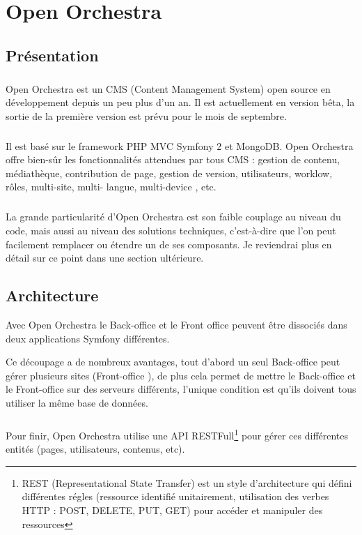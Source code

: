 \chapter{Open Orchestra}
\section{Présentation}
        \paragraph{}
        Open Orchestra est un CMS (Content Management  System) open source en développement depuis un peu plus d'un an. Il est actuellement en version bêta, la sortie de la première version est prévu pour le mois de septembre.
        \paragraph{}
        Il est basé sur le framework PHP MVC Symfony 2 et MongoDB. Open Orchestra offre bien-sûr les fonctionnalités attendues par tous CMS : gestion de contenu, médiathèque, contribution de page, gestion de version, utilisateurs, worklow, rôles,  multi-site, multi- langue,  multi-device , etc.
        \paragraph{}
        La grande particularité d'Open Orchestra est son faible couplage au niveau du code, mais aussi au niveau des solutions techniques, c'est-à-dire que l'on peut facilement remplacer ou étendre un de ses composants. Je reviendrai plus en détail sur ce point dans une section ultérieure.
        
        \section{Architecture}
       Avec Open Orchestra le \og Back-office \fg{} et le \og Front office \fg{} peuvent être dissociés dans deux applications Symfony différentes. 

        Ce découpage a de nombreux avantages, tout d'abord un seul \og Back-office \fg{}  peut gérer plusieurs sites (\og Front-office \fg{}), de plus cela permet de mettre le \og Back-office \fg{} et le \og Front-office \fg{} sur des serveurs différents, l'unique condition est qu'ils doivent tous utiliser la même base de données.
        \paragraph{}
		Pour finir, Open Orchestra utilise une API RESTFull\footnote{REST (Representational State Transfer) est un style d'architecture qui défini différentes régles (ressource identifié unitairement, utilisation des verbes HTTP :  POST, DELETE, PUT, GET) pour accéder et manipuler des ressources } pour gérer ces différentes entités (pages, utilisateurs, contenus, etc).
